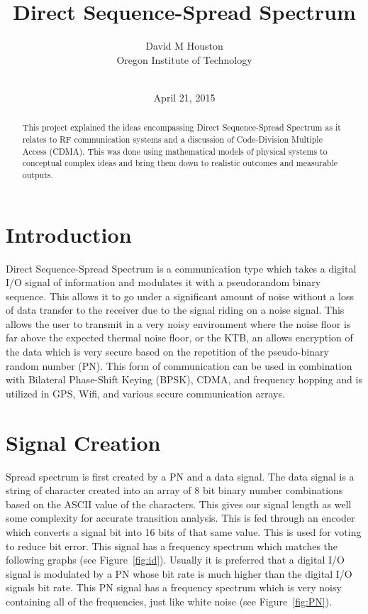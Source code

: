 \documentclass[journal]{IEEEtran}
\begin{document}
\title{Direct Sequence-Spread Spectrum}
\author{David M Houston\\
		Oregon Institute of Technology\\\\
		}
\date{April 21, 2015}

\maketitle

\begin{abstract}
This project explained the ideas encompassing Direct Sequence-Spread Spectrum as it relates to RF communication systems and a discussion of Code-Division Multiple Access (CDMA). This was done using mathematical models of physical systems to conceptual complex ideas and bring them down to realistic outcomes and measurable outputs.
\end{abstract}

\section{Introduction}
Direct Sequence-Spread Spectrum is a communication type which takes a digital I/O signal of information and modulates it with a pseudorandom binary sequence. This allows it to go under a significant amount of noise without a loss of data transfer to the receiver due to the signal riding on a noise signal. This allows the user to transmit in a very noisy environment where the noise floor is far above the expected thermal noise floor, or the KTB, an allows encryption of the data which is very secure based on the repetition of the pseudo-binary random number (PN). This form of communication can be used in combination with Bilateral Phase-Shift Keying (BPSK), CDMA, and frequency hopping and is utilized in GPS, Wifi, and various secure communication arrays. 

\section{Signal Creation}
Spread spectrum is first created by a PN and a data signal. The data signal is a string of character created into an array of 8 bit binary number combinations based on the ASCII value of the characters. This gives our signal length as well some complexity for accurate transition analysis. This is fed through an encoder which converts a signal bit into 16 bits of that same value. This is used for voting to reduce bit error. This signal has a frequency spectrum which matches the following graphs (see Figure~\ref{fig:id}). Usually it is preferred that a digital I/O signal is modulated by a PN whose bit rate is much higher than the digital I/O signals bit rate. This PN signal has a frequency spectrum which is very noisy containing all of the frequencies, just like white noise (see Figure~\ref{fig:PN}).\\
\end{document}
